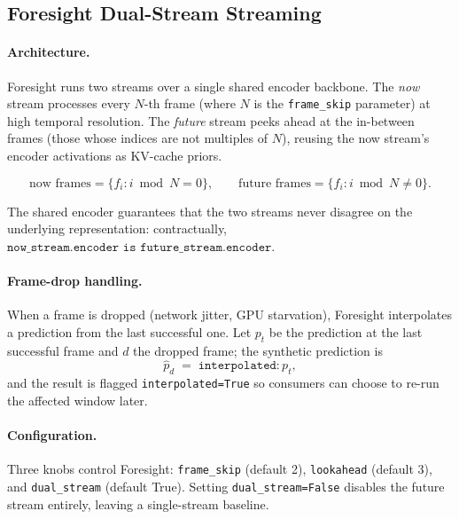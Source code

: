 \documentclass[11pt,a4paper]{article}
\begin{document}
\subsection{Foresight Dual-Stream Streaming}\label{sec:method-fore}

\paragraph{Architecture.}
Foresight runs two streams over a single shared encoder backbone. The
\emph{now} stream processes every $N$-th frame (where $N$ is the
\texttt{frame\_skip} parameter) at high temporal resolution. The
\emph{future} stream peeks ahead at the in-between frames (those whose
indices are not multiples of $N$), reusing the now stream's encoder
activations as KV-cache priors.

\begin{equation}\label{eq:foresight-frames}
\text{now frames} = \{f_i : i \bmod N = 0\}, \qquad
\text{future frames} = \{f_i : i \bmod N \neq 0\}.
\end{equation}

The shared encoder guarantees that the two streams never disagree on the
underlying representation: contractually,
$\texttt{now\_stream.encoder is future\_stream.encoder}$.

\paragraph{Frame-drop handling.}
When a frame is dropped (network jitter, GPU starvation), Foresight
interpolates a prediction from the last successful one. Let $p_t$ be the
prediction at the last successful frame and $d$ the dropped frame; the
synthetic prediction is
\begin{equation}\label{eq:interpolation}
\hat{p}_d \;=\; \texttt{interpolated:} \, p_t,
\end{equation}
and the result is flagged \texttt{interpolated=True} so consumers can
choose to re-run the affected window later.

\paragraph{Configuration.}
Three knobs control Foresight: \texttt{frame\_skip} (default 2),
\texttt{lookahead} (default 3), and \texttt{dual\_stream} (default
True). Setting \texttt{dual\_stream=False} disables the future stream
entirely, leaving a single-stream baseline.
\end{document}
